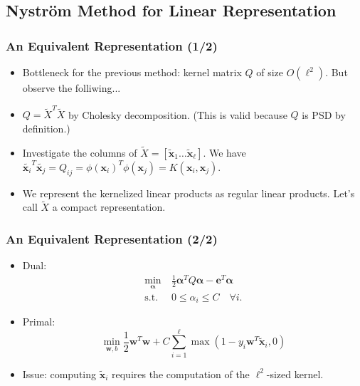\documentclass{beamer}
\def\bw{{\boldsymbol w}}
\def\balpha{{\boldsymbol \alpha}}
\def\be{{\boldsymbol e}}
\def\bx{{\boldsymbol x}}
\def\x{{\mathbf x}}
\begin{document}
\subsection{Nystr\"om Method for Linear Representation}
\begin{frame}
  \frametitle{An Equivalent Representation (1/2)}
  \begin{itemize}
    \item Bottleneck for the previous method: kernel matrix $Q$ of size $O(\ell^2)$. But observe the folliwing...
    \pause
    \item $Q = \tilde{X}^T\tilde{X}$ by Cholesky decomposition. (This is valid because $Q$ is PSD by definition.)
    \item Investigate the columns of $\tilde{X} = [\tilde{\bx}_1 \dots \tilde{\bx}_\ell]$. We have 
    $
    \tilde{\bx_i}^T \tilde{\bx_j} = 
    Q_{ij} = 
    \phi(\bx_i)^T \phi(\x_j) = K(\bx_i,\bx_j) 
    $.
    \pause
    \item We represent the kernelized linear products as regular linear products. Let's call $\tilde{X}$ a compact representation. 
  \end{itemize}
\end{frame}

\begin{frame}
  \frametitle{An Equivalent Representation (2/2)}
  \begin{itemize}
    \item Dual: 
    \begin{align}
    \min_{\balpha} \  &  \frac{1}{2} \balpha^T Q  \balpha - \be^T \balpha \nonumber \\
    \mbox{s.t.} \  & 0 \le \alpha_i \le C \quad \forall i \mbox{.} \nonumber
    \end{align}
    \pause
    \item Primal:
    \begin{equation}
      \min_{\bw, b}
      \frac{1}{2} \bw^T\bw + C\sum_{i=1}^\ell \max(1-y_i\bw^T\tilde{\bx}_i, 0) \nonumber
    \end{equation} 
    \pause
    \item Issue: computing $\tilde{\bx}_i$ requires the computation of the $\ell^2$-sized kernel.
  \end{itemize}
\end{frame}
\end{document}
